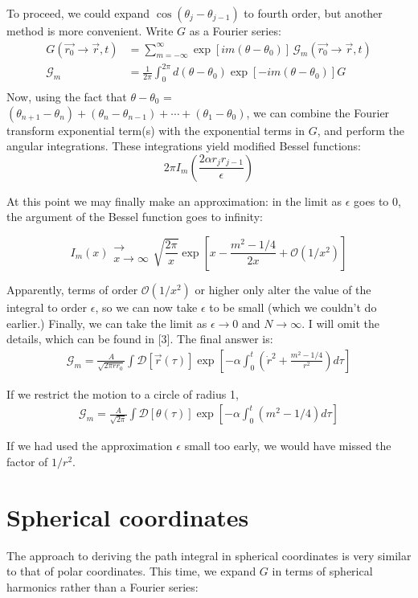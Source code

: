 \documentclass[12pt,a4paper]{article}
\begin{document}
To proceed, we could expand $\cos(\theta_j-\theta_{j-1})$ to fourth order, but another method is more convenient. Write $G$ as a Fourier series:
\begin{align*}
G(\vec{r_0}\rightarrow{\vec{r}}, t) &= \sum_{m=-\infty}^{\infty}\exp[im(\theta-\theta_0)]\,\mathcal{G}_m(\vec{r_0}\rightarrow{\vec{r}}, t)\\
\mathcal{G}_m &= \frac{1}{2\pi}\int_0^{2\pi}d(\theta-\theta_0)\exp[-im(\theta-\theta_0)]G\\
\end{align*}
Now, using the fact that $\theta - \theta_0$ = $(\theta_{n+1}-\theta_n)+(\theta_n-\theta_{n-1})+\cdots+(\theta_1-\theta_0)$, we can combine the Fourier transform exponential term(s) with the exponential terms in $G$, and perform the angular integrations. These integrations yield modified Bessel functions:
\[
2\pi I_m\left(\frac{2\alpha r_jr_{j-1}}{\epsilon}\right)
\]

At this point we may finally make an approximation: in the limit as $\epsilon$ goes to 0, the argument of the Bessel function goes to infinity:

\[
I_m(x) \substack{\longrightarrow\\ x \rightarrow \infty} \sqrt{\frac{2\pi}{x}}\exp\left[x-\frac{m^2-1/4}{2x}+\mathcal{O}(1/x^2)\right]
\]

Apparently, terms of order $\mathcal{O}(1/x^2)$ or higher only alter the value of the integral to order $\epsilon$, so we can now take $\epsilon$ to be small (which we couldn't do earlier.) Finally, we can take the limit as $\epsilon\rightarrow 0 $ and $N\rightarrow \infty$. I will omit the details, which can be found in [3]. The final answer is:
\begin{align*}
\mathcal{G}_m=\frac{A}{\sqrt{2\pi r r_0}}\int \mathcal{D}[\vec{r}(\tau)]\exp\left[-\alpha\int_0^t\left(\dot{r}^2+\frac{m^2-1/4}{r^2}\right)d\tau\right]
\end{align*}

If we restrict the motion to a circle of radius 1,
\begin{align*}
\mathcal{G}_m=\frac{A}{\sqrt{2\pi}}\int \mathcal{D}[\theta(\tau)]\exp\left[-\alpha\int_0^t\left(m^2-1/4\right)d\tau\right]
\end{align*}

If we had used the approximation $\epsilon$ small too early, we would have missed the factor of $1/r^2$.

\section{Spherical coordinates}
The approach to deriving the path integral in spherical coordinates is very similar to that of polar coordinates. This time, we expand $G$ in terms of spherical harmonics rather than a Fourier series:
\end{document}

